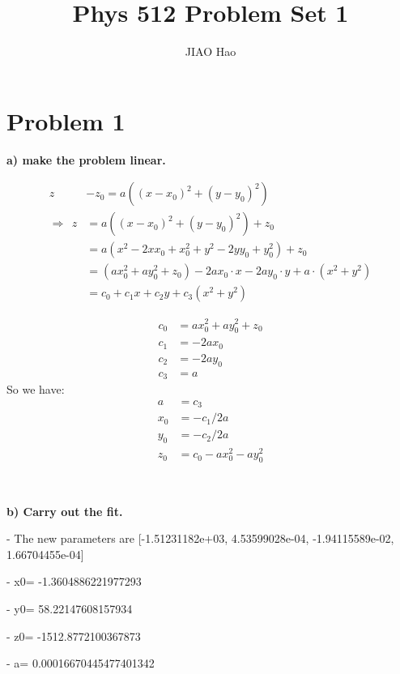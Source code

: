 \documentclass[showpacs, oneside, onecolumn, prl, amsmath, amssymb, nofootinbib, superscriptaddress, notitlepage]{revtex4-1}
\newcommand\bas{\begin{align*}}
\begin{document}
	
\title{Phys 512 Problem Set 1}


\author{JIAO Hao}

\maketitle



\section{Problem 1}

\textbf{a) make the problem linear. }

\bas
z & -z_0=a((x-x_0)^2+(y-y_0)^2)\\
\Rightarrow\ \ z&=a((x-x_0)^2+(y-y_0)^2)+z_0\\
&=a(x^2-2xx_0+x_0^2+y^2-2yy_0+y_0^2)+z_0\\
&=(ax_0^2+ay_0^2+z_0)-2ax_0\cdot x-2ay_0\cdot y+a\cdot(x^2+y^2)\\
&=c_0+c_1 x+c_2 y+c_3(x^2+y^2)
\end{align*}

\bas
c_0&=ax_0^2+ay_0^2+z_0\\
c_1&=-2ax_0\\
c_2&=-2ay_0\\
c_3&=a
\end{align*}
So we have:
\bas
a&=c_3\\
x_0&=-c_1/2a\\
y_0&=-c_2/2a\\
z_0&=c_0-ax_0^2-ay_0^2
\end{align*}

~~~~

\textbf{b) Carry out the fit.}

- The new parameters are  [-1.51231182e+03, 4.53599028e-04, -1.94115589e-02, 1.66704455e-04]

- x0= -1.3604886221977293 

- y0= 58.22147608157934 

- z0= -1512.8772100367873 

- a= 0.00016670445477401342
\end{document}
